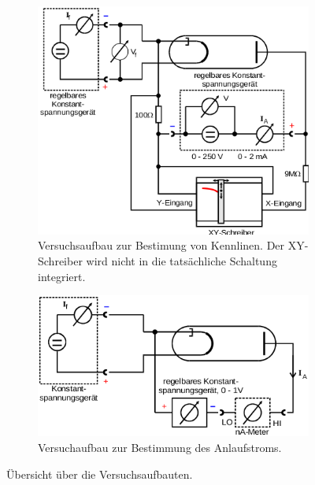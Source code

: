 \begin{figure}
\centering
  \begin{subfigure}{0.4\textwidth}
    \centering
    \includegraphics[width=\textwidth]{aufbkenn.png}
    \caption{Versuchsaufbau zur Bestimung von Kennlinen\cite{anleitung}. Der XY-Schreiber
    wird nicht in die tatsächliche Schaltung integriert.}
    \label{abb:7}
  \end{subfigure}
  \begin{subfigure}{0.4\textwidth}
    \centering
    \includegraphics[width=\textwidth]{aufbanl.png}
    \caption{Versuchaufbau zur Bestimmung des Anlaufstroms\cite{anleitung}.}
    \label{abb:8}
  \end{subfigure}
  \caption{Übersicht über die Versuchsaufbauten.}
\end{figure}
